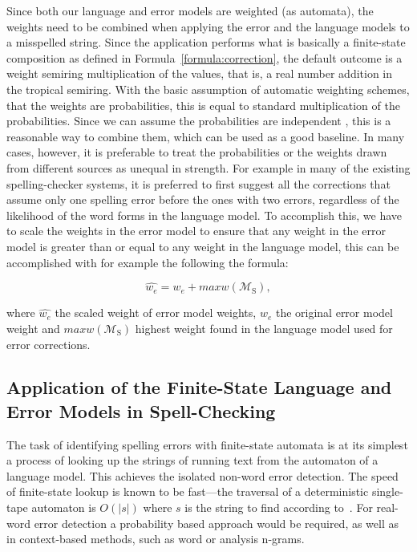 \documentclass[a4paper,12pt]{article}
\begin{document}
Since both our language and error models are weighted (as automata), the
weights need to be combined when applying the error and the language models to
a misspelled string. Since the application performs what is basically a
finite-state composition as defined in Formula~\ref{formula:correction}, the
default outcome is a weight semiring multiplication of the values, that is, a
real number addition in the tropical semiring. With the basic assumption of
automatic weighting schemes, that the weights are probabilities, this is equal
to standard multiplication of the probabilities. Since we can assume the
probabilities are independent \cite[]{church1991probability}, this is a
reasonable way to combine them, which can be used as a good baseline. In many
cases, however, it is preferable to treat the probabilities or the weights
drawn from different sources as unequal in strength. For example in many of the
existing spelling-checker systems, it is preferred to first suggest all the
corrections that assume only one spelling error before the ones  with two
errors, regardless of the likelihood of the word forms in the language model.
To accomplish this, we have to scale the weights in the error model to ensure
that any weight in the error model is greater than or equal to any weight in
the language model, this can be accomplished with for example the following
the formula: 

\begin{equation}
    \hat{w_e} = w_e + maxw(\mathcal{M}_\mathrm{S}),
\end{equation}

where $\hat{w_e}$ the scaled weight of error model weights, $w_e$ the original
error model weight and $maxw(\mathcal{M}_\mathrm{S})$ highest weight found in
the language model used for error corrections.

\subsection{Application of the Finite-State Language and Error Models in
Spell-Checking}

The task of identifying spelling errors with finite-state automata is at its
simplest a process of looking up the strings of running text from the automaton
of a language model. This achieves the isolated non-word error detection. The
speed of finite-state lookup is known to be fast---the traversal of a
deterministic single-tape automaton is $O(|s|)$ where $s$ is the string to find
according to~\cite{aho2007compilers}.  For real-word error detection a
probability based approach would be required, as well as in context-based
methods, such as word or analysis n-grams.
\end{document}
